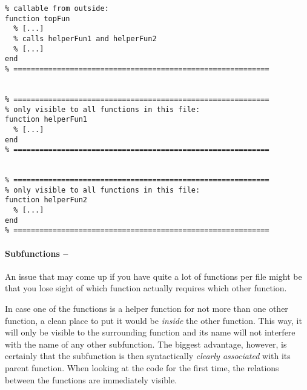 \begin{lstlisting}[framerule=2pt,rulecolor=\color{goodgreen},float,label={listing:multiple-functions},caption={One source containing three functions: Useful when \lstinline!helperFun1! and \lstinline!helperFun2! are only needed by \lstinline!topFun!.}]
% ===========================================================
% callable from outside:
function topFun
  % [...]
  % calls helperFun1 and helperFun2
  % [...]
end
% ===========================================================


% ===========================================================
% only visible to all functions in this file:
function helperFun1
  % [...]
end
% ===========================================================


% ===========================================================
% only visible to all functions in this file:
function helperFun2
  % [...]
end
% ===========================================================
\end{lstlisting}


\paragraph{Subfunctions -- \cleansymbol\cleansymbol}
An issue that may come up if you have quite a lot of functions per file might be that you lose sight of which function actually requires which other function.

In case one of the functions is a helper function for not more than one other function, a clean place to put it would be \emph{inside} the other function. This way, it will only be visible to the surrounding function and its name will not interfere with the name of any other subfunction. The biggest advantage, however, is certainly that the subfunction is then syntactically \emph{clearly associated} with its parent function. When 
looking at the code for the first time, the relations between the functions are immediately visible.



